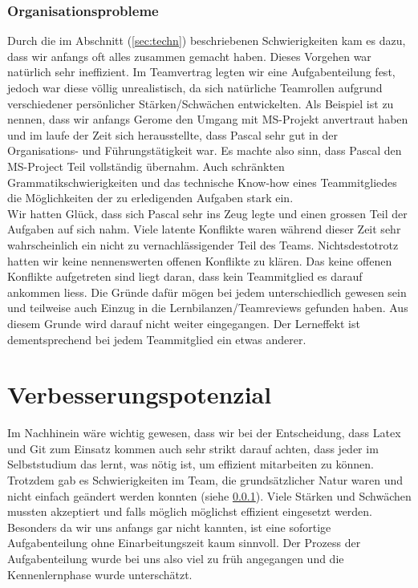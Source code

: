 \subsubsection {Organisationsprobleme} \label{sec:orgprob}
Durch die im Abschnitt (\ref{sec:techn}) beschriebenen Schwierigkeiten kam es dazu, dass wir anfangs oft alles zusammen gemacht haben. Dieses Vorgehen war natürlich sehr ineffizient. Im Teamvertrag legten wir eine Aufgabenteilung fest, jedoch war diese völlig unrealistisch, da sich natürliche Teamrollen aufgrund verschiedener persönlicher Stärken/Schwächen entwickelten. Als Beispiel ist zu nennen, dass wir anfangs Gerome den Umgang mit MS-Projekt anvertraut haben und im laufe der Zeit sich herausstellte, dass Pascal sehr gut in der Organisations- und Führungstätigkeit war. Es machte also sinn, dass Pascal den MS-Project Teil vollständig übernahm. Auch schränkten Grammatikschwierigkeiten und das technische Know-how eines Teammitgliedes die Möglichkeiten der zu erledigenden Aufgaben stark ein. \\
Wir hatten Glück, dass sich Pascal sehr ins Zeug legte und einen grossen Teil der Aufgaben auf sich nahm. Viele latente Konflikte waren während dieser Zeit sehr wahrscheinlich ein nicht zu vernachlässigender Teil des Teams. Nichtsdestotrotz hatten wir keine nennenswerten offenen Konflikte zu klären. Das keine offenen Konflikte aufgetreten sind liegt daran, dass kein Teammitglied es darauf ankommen liess. Die Gründe dafür mögen bei jedem unterschiedlich gewesen sein und teilweise auch Einzug in die Lernbilanzen/Teamreviews gefunden haben. Aus diesem Grunde wird darauf nicht weiter eingegangen. Der Lerneffekt ist dementsprechend bei jedem Teammitglied ein etwas anderer.

\section{Verbesserungspotenzial}

Im Nachhinein wäre wichtig gewesen, dass wir bei der Entscheidung, dass Latex und Git zum Einsatz kommen auch sehr strikt darauf achten, dass jeder im Selbststudium das lernt, was nötig ist, um effizient mitarbeiten zu können. \\
Trotzdem gab es Schwierigkeiten im Team, die grundsätzlicher Natur waren und nicht einfach geändert werden konnten (siehe \ref{sec:orgprob}). Viele Stärken und Schwächen mussten akzeptiert und falls möglich möglichst effizient eingesetzt werden. \\
Besonders da wir uns anfangs gar nicht kannten, ist eine sofortige Aufgabenteilung ohne Einarbeitungszeit kaum sinnvoll. Der Prozess der Aufgabenteilung wurde bei uns also viel zu früh angegangen und die Kennenlernphase wurde unterschätzt. 